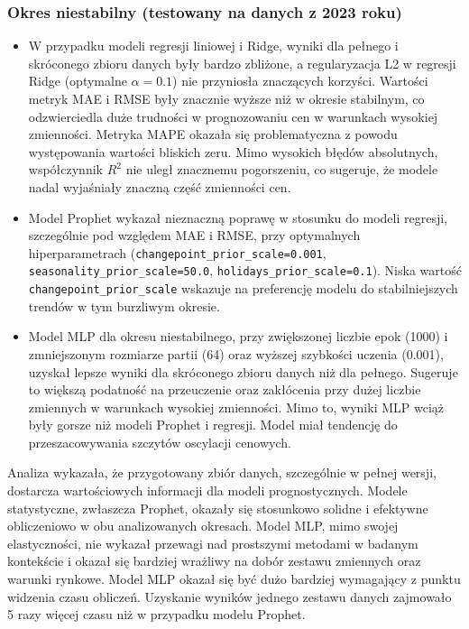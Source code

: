 \subsubsection{Okres niestabilny (testowany na danych z 2023 roku)}
\begin{itemize}
    \item W przypadku modeli regresji liniowej i Ridge, wyniki dla pełnego i skróconego zbioru danych były bardzo zbliżone, a regularyzacja L2 w regresji Ridge (optymalne $\alpha = 0.1$) nie przyniosła znaczących korzyści. Wartości metryk MAE i RMSE były znacznie wyższe niż w okresie stabilnym, co odzwierciedla duże trudności w prognozowaniu cen w warunkach wysokiej zmienności. Metryka MAPE okazała się problematyczna z powodu występowania wartości bliskich zeru. Mimo wysokich błędów absolutnych, współczynnik $R^2$ nie uległ znacznemu pogorszeniu, co sugeruje, że modele nadal wyjaśniały znaczną część zmienności cen.
    \item Model Prophet wykazał nieznaczną poprawę w stosunku do modeli regresji, szczególnie pod względem MAE i RMSE, przy optymalnych hiperparametrach (\texttt{changepoint\_prior\_scale=0.001}, \texttt{seasonality\_prior\_scale=50.0}, \texttt{holidays\_prior\_scale=0.1}). Niska wartość\\ \texttt{changepoint\_prior\_scale} wskazuje na preferencję modelu do stabilniejszych trendów w tym burzliwym okresie.
    \item Model MLP dla okresu niestabilnego, przy zwiększonej liczbie epok (1000) i zmniejszonym rozmiarze partii (64) oraz wyższej szybkości uczenia (0.001), uzyskał lepsze wyniki dla skróconego zbioru danych niż dla pełnego. Sugeruje to większą podatność na przeuczenie oraz zakłócenia przy dużej liczbie zmiennych w warunkach wysokiej zmienności. Mimo to, wyniki MLP wciąż były gorsze niż modeli Prophet i regresji. Model miał tendencję do przeszacowywania szczytów oscylacji cenowych.
\end{itemize}

Analiza wykazała, że przygotowany zbiór danych, szczególnie w pełnej wersji, dostarcza wartościowych informacji dla modeli prognostycznych. Modele statystyczne, zwłaszcza Prophet, okazały się stosunkowo solidne i efektywne obliczeniowo w obu analizowanych okresach. Model MLP, mimo swojej elastyczności, nie wykazał przewagi nad prostszymi metodami w badanym kontekście i okazał się bardziej wrażliwy na dobór zestawu zmiennych oraz warunki rynkowe. Model MLP okazał się być dużo bardziej wymagający z punktu widzenia czasu obliczeń. Uzyskanie wyników jednego zestawu danych zajmowało 5 razy więcej czasu niż w przypadku modelu Prophet.

